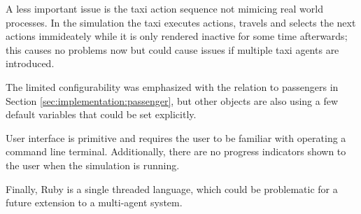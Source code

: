 A less important issue is the taxi action sequence not mimicing real world
processes. In the simulation the taxi executes actions, travels and selects the
next actions immideately while it is only rendered inactive for some time
afterwards; this causes no problems now but could cause issues if multiple taxi
agents are introduced.

The limited configurability was emphasized with the relation to passengers in
Section \ref{sec:implementation:passenger}, but other objects are also using a
few default variables that could be set explicitly. 

User interface is primitive and requires the user to be familiar with operating
a command line terminal. Additionally, there are no progress indicators shown
to the user when the simulation is running.

Finally, Ruby is a single threaded language, which could be problematic for a
future extension to a multi-agent system.

